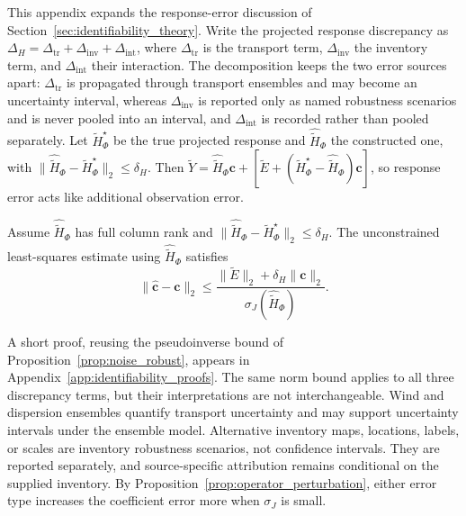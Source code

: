 This appendix expands the response-error discussion of
Section~\ref{sec:identifiability_theory}.  Write the projected
response discrepancy as
\(\Delta_H=\Delta_{\mathrm{tr}}+\Delta_{\mathrm{inv}}+\Delta_{\mathrm{int}}\),
where \(\Delta_{\mathrm{tr}}\) is the transport term, \(\Delta_{\mathrm{inv}}\)
the inventory term, and \(\Delta_{\mathrm{int}}\) their interaction.  The
decomposition keeps the two error sources apart: \(\Delta_{\mathrm{tr}}\) is
propagated through transport ensembles and may become an uncertainty interval,
whereas \(\Delta_{\mathrm{inv}}\) is reported only as named robustness scenarios
and is never pooled into an interval, and \(\Delta_{\mathrm{int}}\) is recorded
rather than pooled separately.  Let \(\widetilde H_\Phi^\star\) be the true
projected response and \(\widehat{\widetilde H}_\Phi\) the constructed one, with
\(\|\widehat{\widetilde H}_\Phi-\widetilde H_\Phi^\star\|_2\le\delta_H\).  Then
\(\widetilde Y=\widehat{\widetilde H}_\Phi\mathbf c
+[\widetilde E+(\widetilde H_\Phi^\star-\widehat{\widetilde H}_\Phi)\mathbf c]\),
so response error acts like additional observation error.

\begin{proposition}
\label{prop:operator_perturbation}
Assume \(\widehat{\widetilde H}_\Phi\) has full column rank and
\(\|\widehat{\widetilde H}_\Phi-\widetilde H_\Phi^\star\|_2\le\delta_H\).
The unconstrained least-squares estimate using
\(\widehat{\widetilde H}_\Phi\) satisfies
\begin{equation}
\|\widehat{\mathbf c}-\mathbf c\|_2
\le
\frac{\|\widetilde E\|_2+\delta_H\|\mathbf c\|_2}
{\sigma_J(\widehat{\widetilde H}_\Phi)}.
\label{eq:operator_error_bound}
\end{equation}
\end{proposition}

A short proof, reusing the pseudoinverse bound of
Proposition~\ref{prop:noise_robust}, appears in
Appendix~\ref{app:identifiability_proofs}.
The same norm bound applies to all three discrepancy terms, but their
interpretations are not interchangeable.  Wind and dispersion ensembles
quantify transport uncertainty and may support uncertainty intervals under the
ensemble model.  Alternative inventory maps, locations, labels, or scales are
inventory robustness scenarios, not confidence intervals.  They are reported
separately, and source-specific attribution remains conditional on the supplied
inventory.  By Proposition~\ref{prop:operator_perturbation}, either error type
increases the coefficient error more when \(\sigma_J\) is small.


